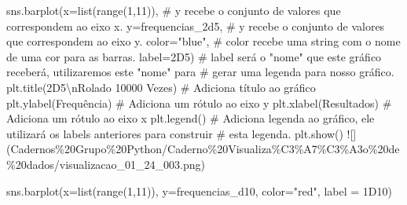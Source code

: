 \documentclass[
  letterpaper,
  DIV=11,
  numbers=noendperiod]{scrreprt}
\newenvironment{Shaded}{\begin{snugshade}}{\end{snugshade}}
\newcommand{\BuiltInTok}[1]{\textcolor[rgb]{0.00,0.23,0.31}{#1}}
\newcommand{\CharTok}[1]{\textcolor[rgb]{0.13,0.47,0.30}{#1}}
\newcommand{\CommentTok}[1]{\textcolor[rgb]{0.37,0.37,0.37}{#1}}
\newcommand{\DecValTok}[1]{\textcolor[rgb]{0.68,0.00,0.00}{#1}}
\newcommand{\ErrorTok}[1]{\textcolor[rgb]{0.68,0.00,0.00}{#1}}
\newcommand{\NormalTok}[1]{\textcolor[rgb]{0.00,0.23,0.31}{#1}}
\newcommand{\OperatorTok}[1]{\textcolor[rgb]{0.37,0.37,0.37}{#1}}
\newcommand{\StringTok}[1]{\textcolor[rgb]{0.13,0.47,0.30}{#1}}
\begin{document}
\begin{Shaded}
\begin{Highlighting}[]
\NormalTok{sns.barplot(x}\OperatorTok{=}\BuiltInTok{list}\NormalTok{(}\BuiltInTok{range}\NormalTok{(}\DecValTok{1}\NormalTok{,}\DecValTok{11}\NormalTok{)),             }\CommentTok{\# \textasciigrave{}y\textasciigrave{} recebe o conjunto de valores que correspondem ao eixo x.}
\NormalTok{            y}\OperatorTok{=}\NormalTok{frequencias\_2d5,               }\CommentTok{\# \textasciigrave{}y\textasciigrave{} recebe o conjunto de valores que correspondem ao eixo y.}
\NormalTok{            color}\OperatorTok{=}\StringTok{"blue"}\NormalTok{,                    }\CommentTok{\# \textasciigrave{}color\textasciigrave{} recebe uma string com o nome de uma cor para as barras.}
\NormalTok{            label}\OperatorTok{=}\StringTok{\textquotesingle{}2D5\textquotesingle{}}\NormalTok{)                     }\CommentTok{\# \textasciigrave{}label\textasciigrave{} será o "nome" que este gráfico receberá, utilizaremos este "nome" para}
                                             \CommentTok{\# gerar uma legenda para nosso gráfico.}
\NormalTok{plt.title(}\StringTok{\textquotesingle{}2D5}\CharTok{\textbackslash{}n}\StringTok{Rolado 10000 Vezes\textquotesingle{}}\NormalTok{)         }\CommentTok{\# Adiciona título ao gráfico}
\NormalTok{plt.ylabel(}\StringTok{\textquotesingle{}Frequência\textquotesingle{}}\NormalTok{)                     }\CommentTok{\# Adiciona um rótulo ao eixo y}
\NormalTok{plt.xlabel(}\StringTok{\textquotesingle{}Resultados\textquotesingle{}}\NormalTok{)                     }\CommentTok{\# Adiciona um rótulo ao eixo x}
\NormalTok{plt.legend()                                 }\CommentTok{\# Adiciona legenda ao gráfico, ele utilizará os \textasciigrave{}labels\textasciigrave{} anteriores para construir}
                                             \CommentTok{\# esta legenda.}
\NormalTok{plt.show()                                   }
\OperatorTok{!}\NormalTok{[](Cadernos}\OperatorTok{\%}\DecValTok{20}\ErrorTok{Grupo}\OperatorTok{\%}\DecValTok{20}\ErrorTok{Python}\OperatorTok{/}\NormalTok{Caderno}\OperatorTok{\%}\DecValTok{20}\ErrorTok{Visualiza}\OperatorTok{\%}\NormalTok{C3}\OperatorTok{\%}\NormalTok{A7}\OperatorTok{\%}\NormalTok{C3}\OperatorTok{\%}\NormalTok{A3o}\OperatorTok{\%}\DecValTok{20}\ErrorTok{de}\OperatorTok{\%}\DecValTok{20}\ErrorTok{dados}\OperatorTok{/}\NormalTok{visualizacao\_01\_24\_003.png)}

\NormalTok{sns.barplot(x}\OperatorTok{=}\BuiltInTok{list}\NormalTok{(}\BuiltInTok{range}\NormalTok{(}\DecValTok{1}\NormalTok{,}\DecValTok{11}\NormalTok{)),}
\NormalTok{            y}\OperatorTok{=}\NormalTok{frequencias\_d10, }
\NormalTok{            color}\OperatorTok{=}\StringTok{"red"}\NormalTok{,}
\NormalTok{            label }\OperatorTok{=} \StringTok{\textquotesingle{}1D10\textquotesingle{}}\NormalTok{)}


\end{Highlighting}
\end{Shaded}
\end{document}
